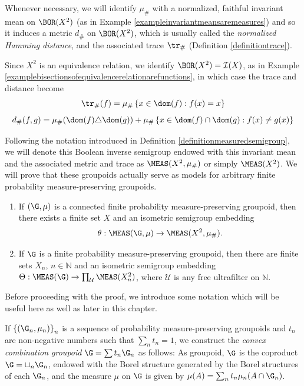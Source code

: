 Whenever necessary, we will identify $\mu_\#$ with a normalized, faithful invariant mean on $\BOR(X^2)$ (as in Example \ref{exampleinvariantmeansaremeasures}) and so it induces a metric $d_\#$ on $\BOR(X^2)$, which is usually called the \emph{normalized Hamming distance}, and the associated trace $\tr_\#$ (Definition \ref{definitiontrace}).

Since $X^2$ is an equivalence relation, we identify $\BOR(X^2)=\mathcal{I}(X)$, as in Example \ref{examplebisectionsofequivalencerelationarefunctions}, in which case the trace and distance become
\[\tr_\#(f)=\mu_\#\left\{x\in\dom(f):f(x)=x\right\}\]
\[d_\#(f,g)=\mu_\#(\dom(f)\triangle\dom(g))+\mu_\#\left\{x\in\dom(f)\cap\dom(g):f(x)\neq g(x)\right\}\]

Following the notation introduced in Definition \ref{definitionmeasuredsemigroup}, we will denote this Boolean inverse semigroup endowed with this invariant mean and the associated metric and trace as $\MEAS(X^2,\mu_\#)$ or simply $\MEAS(X^2)$. We will prove that these groupoids actually serve as models for arbitrary finite probability measure-preserving groupoids.

\begin{proposition}\label{propositionfinitegroupoidsaresofic}
\begin{enumerate}
\item[(a)] If $(\G,\mu)$ is a connected finite probability measure-preserving groupoid, then there exists a finite set $X$ and an isometric semigroup embedding
\[\theta:\MEAS(\G,\mu)\to\MEAS(X^2,\mu_\#).\]
\item[(b)] If $\G$ is a finite probability measure-preserving groupoid, then there are finite sets $X_n$, $n\in\mathbb{N}$ and an isometric semigroup embedding $\Theta:\MEAS(\G)\to\prod_\mathcal{U}\MEAS(X_n^2)$, where $\mathcal{U}$ is any free ultrafilter on $\mathbb{N}$.
\end{enumerate}
\end{proposition}

Before proceeding with the proof, we introduce some notation which will be useful here as well as later in this chapter.

\begin{definition}
If $\left\{(\G_n,\mu_n)\right\}_n$ is a sequence of probability measure-preserving groupoids and $t_n$ are non-negative numbers such that $\sum_n t_n=1$, we construct the \emph{convex combination groupoid} $\G=\sum t_n\G_n$ as follows: As groupoid, $\G$ is the coproduct $\G=\sqcup_n\G_n$, endowed with the Borel structure generated by the Borel structures of each $\G_n$, and the measure $\mu$ on $\G$ is given by $\mu(A)=\sum_n t_n\mu_n(A\cap\G_n)$.
\end{definition}

